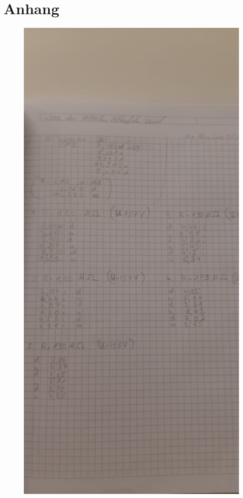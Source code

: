 \section{Anhang}

\begin{figure}[H]
    \centering
    \includegraphics[width=\textwidth]{messdaten/U157.jpeg}
\end{figure}


